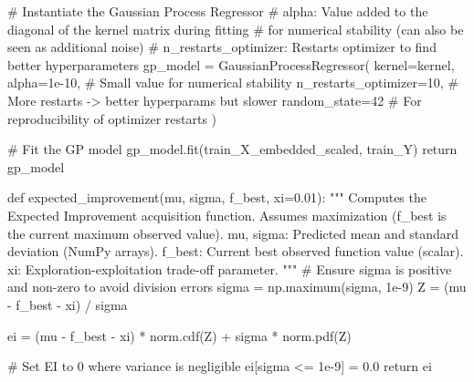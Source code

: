\documentclass[
  letterpaper,
  DIV=11,
  numbers=noendperiod]{scrartcl}
\newenvironment{Shaded}{\begin{snugshade}}{\end{snugshade}}
\newcommand{\CommentTok}[1]{\textcolor[rgb]{0.37,0.37,0.37}{#1}}
\newcommand{\ControlFlowTok}[1]{\textcolor[rgb]{0.00,0.23,0.31}{#1}}
\newcommand{\DecValTok}[1]{\textcolor[rgb]{0.68,0.00,0.00}{#1}}
\newcommand{\FloatTok}[1]{\textcolor[rgb]{0.68,0.00,0.00}{#1}}
\newcommand{\KeywordTok}[1]{\textcolor[rgb]{0.00,0.23,0.31}{#1}}
\newcommand{\NormalTok}[1]{\textcolor[rgb]{0.00,0.23,0.31}{#1}}
\newcommand{\OperatorTok}[1]{\textcolor[rgb]{0.37,0.37,0.37}{#1}}
\begin{document}
\begin{Shaded}
\begin{Highlighting}[]
    \CommentTok{\# Instantiate the Gaussian Process Regressor}
    \CommentTok{\# alpha: Value added to the diagonal of the kernel matrix during fitting}
    \CommentTok{\#        for numerical stability (can also be seen as additional noise)}
    \CommentTok{\# n\_restarts\_optimizer: Restarts optimizer to find better hyperparameters}
\NormalTok{    gp\_model }\OperatorTok{=}\NormalTok{ GaussianProcessRegressor(}
\NormalTok{        kernel}\OperatorTok{=}\NormalTok{kernel,}
\NormalTok{        alpha}\OperatorTok{=}\FloatTok{1e{-}10}\NormalTok{, }\CommentTok{\# Small value for numerical stability}
\NormalTok{        n\_restarts\_optimizer}\OperatorTok{=}\DecValTok{10}\NormalTok{, }\CommentTok{\# More restarts {-}\textgreater{} better hyperparams but slower}
\NormalTok{        random\_state}\OperatorTok{=}\DecValTok{42} \CommentTok{\# For reproducibility of optimizer restarts}
\NormalTok{    )}

    \CommentTok{\# Fit the GP model}
\NormalTok{    gp\_model.fit(train\_X\_embedded\_scaled, train\_Y)}
    \ControlFlowTok{return}\NormalTok{ gp\_model}

\KeywordTok{def}\NormalTok{ expected\_improvement(mu, sigma, f\_best, xi}\OperatorTok{=}\FloatTok{0.01}\NormalTok{):}
    \CommentTok{"""}
\CommentTok{    Computes the Expected Improvement acquisition function.}
\CommentTok{    Assumes maximization (f\_best is the current maximum observed value).}
\CommentTok{    mu, sigma: Predicted mean and standard deviation (NumPy arrays).}
\CommentTok{    f\_best: Current best observed function value (scalar).}
\CommentTok{    xi: Exploration{-}exploitation trade{-}off parameter.}
\CommentTok{    """}
    \CommentTok{\# Ensure sigma is positive and non{-}zero to avoid division errors}
\NormalTok{    sigma }\OperatorTok{=}\NormalTok{ np.maximum(sigma, }\FloatTok{1e{-}9}\NormalTok{)}
\NormalTok{    Z }\OperatorTok{=}\NormalTok{ (mu }\OperatorTok{{-}}\NormalTok{ f\_best }\OperatorTok{{-}}\NormalTok{ xi) }\OperatorTok{/}\NormalTok{ sigma}

\NormalTok{    ei }\OperatorTok{=}\NormalTok{ (mu }\OperatorTok{{-}}\NormalTok{ f\_best }\OperatorTok{{-}}\NormalTok{ xi) }\OperatorTok{*}\NormalTok{ norm.cdf(Z) }\OperatorTok{+}\NormalTok{ sigma }\OperatorTok{*}\NormalTok{ norm.pdf(Z)}

    \CommentTok{\# Set EI to 0 where variance is negligible}
\NormalTok{    ei[sigma }\OperatorTok{\textless{}=} \FloatTok{1e{-}9}\NormalTok{] }\OperatorTok{=} \FloatTok{0.0}
    \ControlFlowTok{return}\NormalTok{ ei}


\end{Highlighting}
\end{Shaded}
\end{document}

